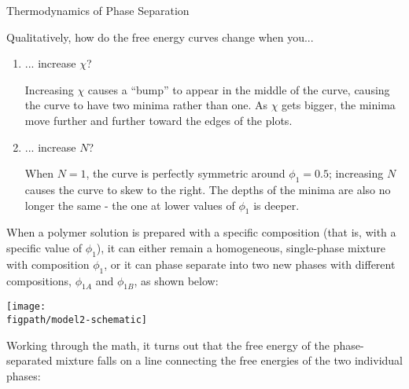 \begin{activity}{Thermodynamics of Phase Separation}
\begin{ctqs}
\begin{solution}[1.5in]
		\end{solution}
	
	\question Qualitatively, how do the free energy curves change when you...
		\begin{enumerate}
			\item ... increase $\chi$?
	
				\begin{solution}[1in]
				
					Increasing $\chi$ causes a ``bump'' to appear in the middle of the curve, causing the curve to have two minima rather than one.  As $\chi$ gets bigger, the minima move further and further toward the edges of the plots.
				
				\end{solution}
				
			\item ... increase $N$?
	
				\begin{solution}[1in]
			
					When $N=1$, the curve is perfectly symmetric around $\phi_1=0.5$; increasing $N$ causes the curve to skew to the right.  The depths of the minima are also no longer the same - the one at lower values of $\phi_1$ is deeper.
				
				\end{solution}
		
		\end{enumerate}
		
\end{ctqs}



\begin{model}

	When a polymer solution is prepared with a specific composition (that is, with a specific value of $\phi_1$), it can either remain a homogeneous, single-phase mixture with composition $\phi_1$, or it can phase separate into two new phases with different compositions, $\phi_{1A}$ and $\phi_{1B}$, as shown below:
	
		\centerline{\texttt{[image: \\figpath/model2-schematic]}}
	
	
	Working through the math, it turns out that the free energy of the phase-separated mixture falls on a line connecting the free energies of the two individual phases:
	

\end{model}
\end{activity}
